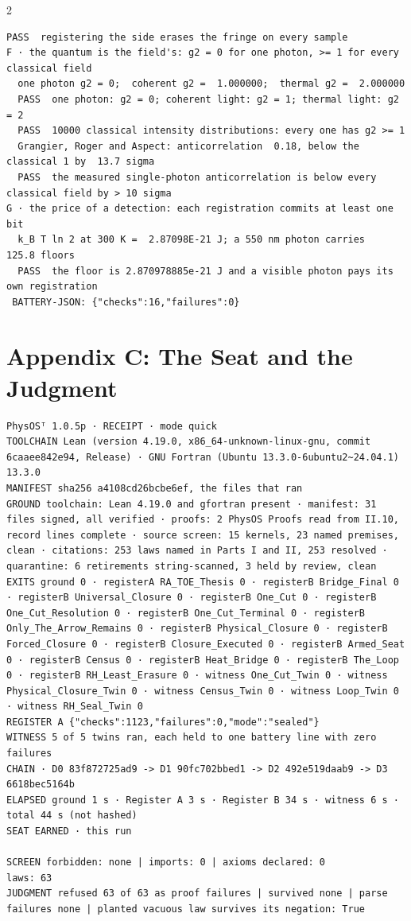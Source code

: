 \documentclass[10pt]{article}
\begin{document}
\begin{multicols}{2}
\begin{Verbatim}[fontsize=\fontsize{6.0}{6.9}\selectfont,breaklines,breakanywhere,breaksymbolleft={}]
  PASS  registering the side erases the fringe on every sample
F · the quantum is the field's: g2 = 0 for one photon, >= 1 for every classical field
  one photon g2 = 0;  coherent g2 =  1.000000;  thermal g2 =  2.000000
  PASS  one photon: g2 = 0; coherent light: g2 = 1; thermal light: g2 = 2
  PASS  10000 classical intensity distributions: every one has g2 >= 1
  Grangier, Roger and Aspect: anticorrelation  0.18, below the classical 1 by  13.7 sigma
  PASS  the measured single-photon anticorrelation is below every classical field by > 10 sigma
G · the price of a detection: each registration commits at least one bit
  k_B T ln 2 at 300 K =  2.87098E-21 J; a 550 nm photon carries   125.8 floors
  PASS  the floor is 2.870978885e-21 J and a visible photon pays its own registration
 BATTERY-JSON: {"checks":16,"failures":0}
\end{Verbatim}
\end{multicols}

\hypertarget{appendix-c-the-seat-and-the-judgment}{%
\section{Appendix C: The Seat and the
Judgment}\label{appendix-c-the-seat-and-the-judgment}}

\begin{Verbatim}[fontsize=\fontsize{6.0}{7.0}\selectfont,breaklines,breakanywhere,breaksymbolleft={}]
PhysOSᵀ 1.0.5p · RECEIPT · mode quick
TOOLCHAIN Lean (version 4.19.0, x86_64-unknown-linux-gnu, commit 6caaee842e94, Release) · GNU Fortran (Ubuntu 13.3.0-6ubuntu2~24.04.1) 13.3.0
MANIFEST sha256 a4108cd26bcbe6ef, the files that ran
GROUND toolchain: Lean 4.19.0 and gfortran present · manifest: 31 files signed, all verified · proofs: 2 PhysOS Proofs read from II.10, record lines complete · source screen: 15 kernels, 23 named premises, clean · citations: 253 laws named in Parts I and II, 253 resolved · quarantine: 6 retirements string-scanned, 3 held by review, clean
EXITS ground 0 · registerA RA_TOE_Thesis 0 · registerB Bridge_Final 0 · registerB Universal_Closure 0 · registerB One_Cut 0 · registerB One_Cut_Resolution 0 · registerB One_Cut_Terminal 0 · registerB Only_The_Arrow_Remains 0 · registerB Physical_Closure 0 · registerB Forced_Closure 0 · registerB Closure_Executed 0 · registerB Armed_Seat 0 · registerB Census 0 · registerB Heat_Bridge 0 · registerB The_Loop 0 · registerB RH_Least_Erasure 0 · witness One_Cut_Twin 0 · witness Physical_Closure_Twin 0 · witness Census_Twin 0 · witness Loop_Twin 0 · witness RH_Seal_Twin 0
REGISTER A {"checks":1123,"failures":0,"mode":"sealed"}
WITNESS 5 of 5 twins ran, each held to one battery line with zero failures
CHAIN · D0 83f872725ad9 -> D1 90fc702bbed1 -> D2 492e519daab9 -> D3 6618bec5164b
ELAPSED ground 1 s · Register A 3 s · Register B 34 s · witness 6 s · total 44 s (not hashed)
SEAT EARNED · this run

SCREEN forbidden: none | imports: 0 | axioms declared: 0
laws: 63
JUDGMENT refused 63 of 63 as proof failures | survived none | parse failures none | planted vacuous law survives its negation: True
\end{Verbatim}
\end{document}
